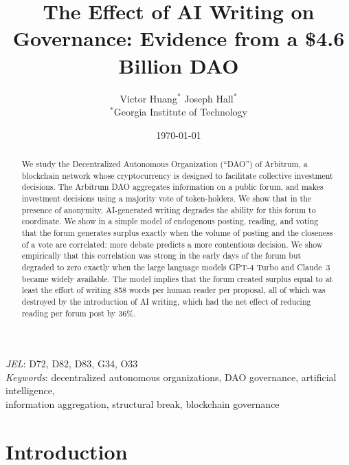 \documentclass[12pt]{article}
\title{\textbf{The Effect of AI Writing on Governance: Evidence from a \$4.6 Billion DAO}}
\author{
  Victor Huang$^{*}$ \quad Joseph Hall$^{*}$ \\[0.5em]
  \small $^{*}$Georgia Institute of Technology
}
\date{\today}
\begin{document}
\maketitle
\vspace{-1.5em}

\begin{singlespace}
\begin{abstract}
\noindent
We study the Decentralized Autonomous Organization (``DAO'') of Arbitrum, a blockchain network whose cryptocurrency is designed to facilitate collective investment decisions.
The Arbitrum DAO aggregates information on a public forum, and makes investment decisions using a majority vote of token-holders.
We show that in the presence of anonymity, AI-generated writing degrades the ability for this forum to coordinate.
We show in a simple model of endogenous posting, reading, and voting that the forum generates surplus exactly when the volume of posting and the closeness of a vote are correlated: more debate predicts a more contentious decision.
We show empirically that this correlation was strong in the early days of the forum but degraded to zero exactly when the large language models GPT-4 Turbo and Claude~3 became widely available.
The model implies that the forum created surplus equal to at least the effort of writing 858 words per human reader per proposal, all of which was destroyed by the introduction of AI writing, which had the net effect of reducing reading per forum post by 36\%.
\end{abstract}

\vspace{0.3em}
{\raggedright
\noindent\textit{JEL}: D72, D82, D83, G34, O33\\
\textit{Keywords}: decentralized autonomous organizations, DAO governance, artificial intelligence,\\
information aggregation, structural break, blockchain governance\par}
\end{singlespace}

\clearpage

\section{Introduction}
\label{sec:intro}

\end{document}
